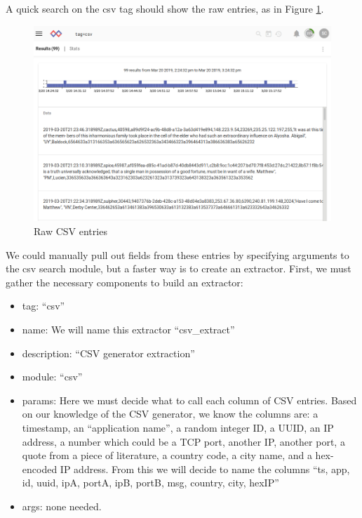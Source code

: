 A quick search on the csv tag should show the raw entries, as in Figure \ref{fig:lab-csv-raw}.


\begin{figure}
	\includegraphics{images/lab-csv-raw.png}
	\caption{Raw CSV entries}
	\label{fig:lab-csv-raw}
\end{figure}

We could manually pull out fields from these entries by specifying
arguments to the csv search module, but a faster way is to create an
extractor. First, we must gather the necessary components to build an
extractor:

\begin{itemize}
\tightlist
\item
  tag: ``csv''
\item
  name: We will name this extractor ``csv\_extract''
\item
  description: ``CSV generator extraction''
\item
  module: ``csv''
\item
  params: Here we must decide what to call each column of CSV entries.
  Based on our knowledge of the CSV generator, we know the columns are:
  a timestamp, an ``application name'', a random integer ID, a UUID,
  an IP address, a number which could be a TCP port, another IP, another
  port, a quote from a piece of literature, a country code, a city name,
  and a hex-encoded IP address. From this we will decide to name the
  columns ``ts, app, id, uuid, ipA, portA, ipB, portB, msg, country,
  city, hexIP''
\item
  args: none needed.
\end{itemize}

